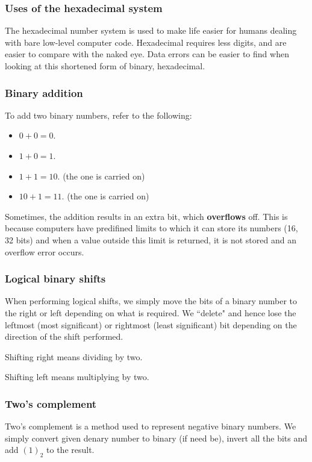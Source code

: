 \documentclass{article}
\begin{document}
\subsubsection{Uses of the hexadecimal system}
The hexadecimal number system is used to make life easier for humans dealing with 
bare low-level computer code. Hexadecimal requires less digits, and are easier to compare
with the naked eye. Data errors can be easier to find when looking at this shortened form
of binary, hexadecimal.

\subsubsection{Binary addition}
To add two binary numbers, refer to the following:
\begin{itemize}
	\item $0 + 0 = 0$.
	\item $1 + 0 = 1$.
	\item $1 + 1 = 10$. (the one is carried on)
	\item $10 + 1 = 11$. (the one is carried on)
\end{itemize}

Sometimes, the addition results in an extra bit, which \textbf{overflows} off. This is
because computers have predifined limits to which it can store its numbers (16, 32 bits)
and when a value outside this limit is returned, it is not stored and an overflow error
occurs.

\subsubsection{Logical binary shifts}
When performing logical shifts, we simply move the bits of a binary number to the right
or left depending on what is required. We ``delete" and hence lose the leftmost (most 
significant) or rightmost (least significant) bit depending on the direction of the shift 
performed.

Shifting right means dividing by two.

Shifting left means multiplying by two.

\subsubsection{Two's complement}
Two's complement is a method used to represent negative binary numbers. We simply
convert given denary number to binary (if need be), invert all the bits and add $(1)_2$ 
to the result.
\end{document}

